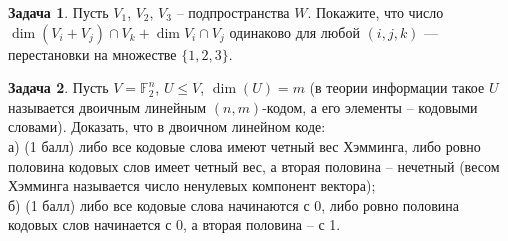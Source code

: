 \documentclass[12pt, fleqn]{extarticle}
\theoremstyle{definition}
\newtheorem{problem}{Задача}
\theoremstyle{remark}
\begin{document}
\begin{problem}
Пусть $V_1$, $V_2$, $V_3$ -- подпространства $W$. Покажите, что число $\dim (V_i + V_j)\cap V_k +\dim V_i\cap V_j$ одинаково для любой $(i,j,k)$ --- перестановки на множестве $\{1,2,3\}$.
\end{problem}

\begin{problem}
Пусть $V = \mathbb{F}_2^{n}$, $U \leqslant V$, $\dim(U) = m$
(в теории информации такое $U$ называется двоичным линейным $(n, m)$-кодом, а его
элементы -- кодовыми словами). Доказать, что в двоичном линейном коде:\\
а) (1 балл) либо все кодовые слова имеют четный вес Хэмминга, либо
ровно половина кодовых слов имеет четный вес, а вторая
половина -- нечетный (весом Хэмминга называется число ненулевых компонент вектора);\\
б) (1 балл) либо все кодовые слова начинаются с 0, либо ровно половина
кодовых слов начинается с 0, а вторая половина -- с 1.
\end{problem}
\end{document}
